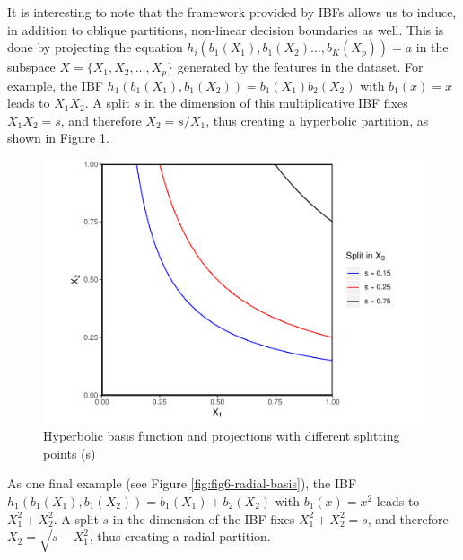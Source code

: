 \documentclass[]{elsarticle} %
\makeatletter
\def\maxwidth{\ifdim\Gin@nat@width>\linewidth\linewidth
\else\Gin@nat@width\fi}
\let\Oldincludegraphics\includegraphics
\renewcommand{\includegraphics}[1]{\Oldincludegraphics[width=\maxwidth]{#1}}
\makeatother
\begin{document}
It is interesting to note that the framework provided by IBFs allows us
to induce, in addition to oblique partitions, non-linear decision
boundaries as well. This is done by projecting the equation
\(h_i(b_1(X_1),b_1(X_2)\dots, b_K(X_p))=a\) in the subspace
\(X=\{X_1, X_2,\dots, X_p\}\) generated by the features in the dataset.
For example, the IBF \(h_1(b_1(X_1),b_1(X_2))=b_1(X_1)b_2(X_2)\) with
\(b_1(x)=x\) leads to \(X_1X_2\). A split \(s\) in the dimension of this
multiplicative IBF fixes \(X_1X_2=s\), and therefore \(X_2=s/X_1\), thus
creating a hyperbolic partition, as shown in Figure
\ref{fig:fig5-hyperbolic-basis}.

\begin{figure}
\centering
\includegraphics{Trees_with_Base_Functions_v2_files/figure-latex/fig5-hyperbolic-basis-1.pdf}
\caption{\label{fig:fig5-hyperbolic-basis}Hyperbolic basis function and
projections with different splitting points (s)}
\end{figure}

As one final example (see Figure \ref{fig:fig6-radial-basis}), the IBF
\(h_1(b_1(X_1),b_1(X_2))=b_1(X_1)+b_2(X_2)\) with \(b_1(x)=x^2\) leads
to \(X_1^2 + X_2^2\). A split \(s\) in the dimension of the IBF fixes
\(X_1^2 + X_2^2=s\), and therefore \(X_2=\sqrt{s-X_1^2}\), thus creating
a radial partition.
\end{document}
